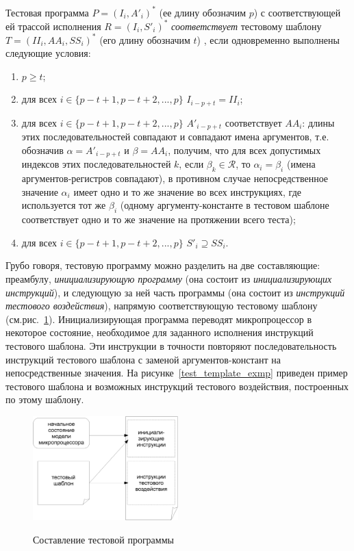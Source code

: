 Тестовая программа $P = (I_i, A'_i)^*$ (ее длину обозначим $p$) с соответствующей ей трассой исполнения $R = (I_i, S'_i)^*$ \emph{соответствует} тестовому шаблону $T = (II_i, AA_i, SS_i)^*$ (его длину обозначим $t$) , если одновременно выполнены следующие условия:
\begin{enumerate}
  \item $p \geqslant t$;
  \item для всех $i \in \{p{-}t{+}1, p{-}t{+}2, ..., p\}$ $I_{i-p+t} = II_i$;
  \item для всех $i \in \{p{-}t{+}1, p{-}t{+}2, ..., p\}$ $A'_{i-p+t}$ соответствует $AA_i$: длины этих последовательностей совпадают и совпадают имена аргументов, т.е. обозначив $\alpha = A'_{i-p+t}$ и $\beta = AA_i$, получим, что для всех допустимых индексов этих последовательностей $k$, если $\beta_k \in \mathcal{R}$, то $\alpha_i = \beta_i$ (имена аргументов-регистров совпадают), в противном случае непосредственное значение $\alpha_i$ имеет одно и то же значение во всех инструкциях, где используется тот же $\beta_i$ (одному аргументу-константе в тестовом шаблоне соответствует одно и то же значение на протяжении всего теста);
  \item для всех $i \in \{p{-}t{+}1, p{-}t{+}2, ..., p\}$ $S'_i \supseteq SS_i$.
\end{enumerate}

Грубо говоря, тестовую программу можно разделить на две составляющие: преамбулу, \emph{инициализирующую программу} (она состоит из \emph{инициализирующих инструкций}), и следующую за ней часть программы (она состоит из \emph{инструкций тестового воздействия}), напрямую соответствующую тестовому шаблону (см.рис.~\ref{problem}). Инициализирующая
программа переводят микропроцессор в некоторое состояние, необходимое для заданного исполнения инструкций тестового шаблона. Эти инструкции в точности повторяют последовательность инструкций тестового шаблона с заменой аргументов-констант на непосредственные значения. На рисунке~\ref{test_template_exmp}
приведен пример тестового шаблона и возможных инструкций тестового
воздействия, построенных по этому шаблону.

\begin{figure}[h] \center
  \includegraphics[width=0.5\textwidth]{1.review/problem}\\
  \caption{Составление тестовой программы}\label{problem}
\end{figure}

